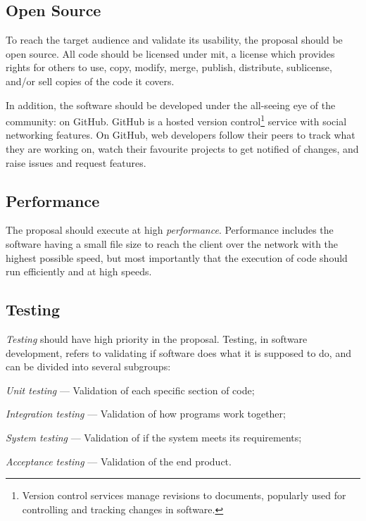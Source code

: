 \subsection{Open Source}\label{open-source}

To reach the target audience and validate its usability, the proposal
  should be open source.
All code should be licensed under \acrshort{mit}, a license which
  provides rights for others to use, copy, modify, merge, publish,
  distribute, sublicense, and\slash or sell copies of the code it covers.

In addition, the software should be developed under the all-seeing eye of
  the community: on GitHub.
GitHub is a hosted version control\footnote{Version
    control services manage revisions to documents, popularly used for
    controlling and tracking changes in software.} service with social
  networking features.
On GitHub, web developers follow their peers to track what they are
  working on, watch their favourite projects to get notified of changes,
  and raise issues and request features.

\subsection{Performance}\label{performance}

The proposal should execute at high \emph{performance}.
Performance includes the software having a small file size to reach the
  client over the network with the highest possible speed, but most
  importantly that the execution of code should run efficiently and at high
  speeds.

\subsection{Testing}\label{testing}

\emph{Testing} should have high priority in the proposal.
Testing, in software development, refers to validating if software does what
  it is supposed to do, and can be divided into several subgroups:

\begin{aenumerate}
\item\emph{Unit testing} --- Validation of each specific section of code;
\item\emph{Integration testing} --- Validation of how programs work together;
\item\emph{System testing} --- Validation of if the system meets its
  requirements;
\item\emph{Acceptance testing} --- Validation of the end product.
\end{aenumerate}

